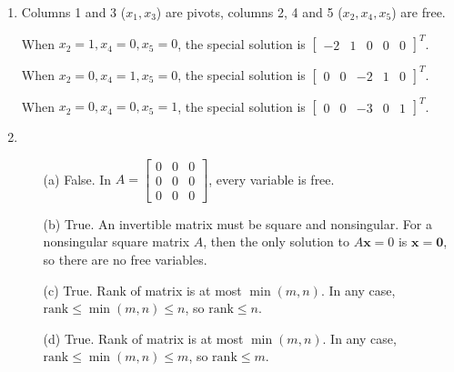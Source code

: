 \documentclass{article}
\begin{document}
\begin{enumerate}
	\item 
		Columns 1 and 3 ($x_1,x_3$) are pivots, columns 2, 4 and 5 ($x_2,x_4,x_5$) are free.

		When $x_2=1,x_4=0,x_5=0$, the special solution is $\begin{bmatrix}
			-2 & 1 & 0 & 0 & 0
		\end{bmatrix}^T$.

		When $x_2=0,x_4=1,x_5=0$, the special solution is $\begin{bmatrix}
			0 & 0 & -2 & 1 & 0
		\end{bmatrix}^T$.

		When $x_2=0,x_4=0,x_5=1$, the special solution is $\begin{bmatrix}
			0 & 0 & -3 & 0 & 1
		\end{bmatrix}^T$.
	
	\item
	\begin{itemize}
		\item[(a)] False. In $A=\begin{bmatrix}
				0 & 0 & 0 \\
				0 & 0 & 0 \\
				0 & 0 & 0
		\end{bmatrix}$, every variable is free.
		\item[(b)] True. An invertible matrix must be square and nonsingular. For a nonsingular square matrix $A$, then the only solution to $A \mathbf{x}=0$ is $\mathbf{x}=\mathbf{0}$, so there are no free variables.
		\item[(c)] True. Rank of matrix is at most $\min(m,n)$. In any case, $\text{rank}\leq\min(m,n)\leq n$, so $\text{rank}\leq n$.
		\item[(d)] True. Rank of matrix is at most $\min(m,n)$. In any case, $\text{rank}\leq\min(m,n)\leq m$, so $\text{rank}\leq m$.
	\end{itemize}
\end{enumerate}
\end{document}
